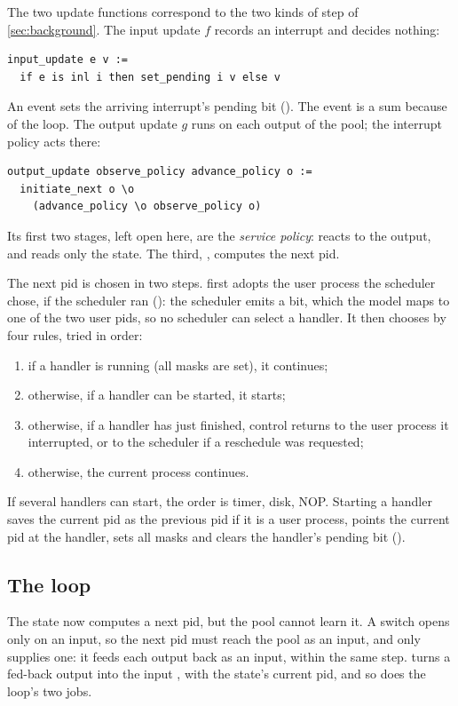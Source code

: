 The two update functions correspond to the two kinds of step of
\cref{sec:background}. The input update $f$ records an interrupt
and decides nothing:
\begin{lstlisting}
input_update e v :=
  if e is inl i then set_pending i v else v
\end{lstlisting}
An  event sets the arriving interrupt's pending bit (). The
event is a sum because of the loop. The output
update $g$ runs on each output of the pool; the interrupt policy acts there:
\begin{lstlisting}
output_update observe_policy advance_policy o :=
  initiate_next o \o
    (advance_policy \o observe_policy o)
\end{lstlisting}
Its first two stages, left open here, are the \emph{service policy}:
 reacts to the output, and  reads only the
state. The third, , computes the next pid.

The next pid is chosen in two steps.  first adopts the user process
the scheduler chose, if the scheduler ran (): the
scheduler emits a bit, which the model maps to one of the two user pids, so no
scheduler can select a handler. It then chooses by
four rules, tried in order:
\begin{enumerate}
\item if a handler is running (all masks are set), it continues;
\item otherwise, if a handler can be started, it starts;
\item otherwise, if a handler has just finished, control returns to the user
  process it interrupted, or to the scheduler if a reschedule was requested;
\item otherwise, the current process continues.
\end{enumerate}
If several handlers can start, the order is timer, disk, NOP.
Starting a handler saves the current pid as the previous pid if it is a user
process, points the current pid at the handler, sets all masks and clears the handler's
pending bit ().

\subsection{The loop}\label{sec:loop}

The state now computes a next pid, but the pool cannot learn it. A switch opens only
on an input, so the next pid must reach the pool as an input, and only 
supplies one: it feeds each output back as an input, within the same step.
 turns a fed-back output  into the input
, with the state's current pid, and so does the loop's two
jobs.

